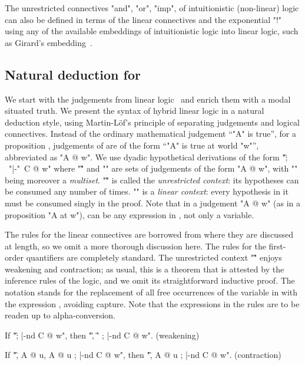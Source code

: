\documentclass{article}
\begin{document}
The unrestricted connectives "and", "or", "imp", \etc of intuitionistic
(non-linear) logic can also be defined in terms of the linear connectives and
the exponential "!"  using any of the available embeddings of intuitionistic
logic into linear logic, such as Girard's embedding~\cite{girard87tcs}.

\subsection{Natural deduction for \hyll}

We start with the judgements from linear logic~\cite{girard87tcs} and enrich
them with a modal situated truth. We present the syntax of hybrid linear logic
in a natural deduction style, using Martin-L\"{o}f's principle of separating
judgements and logical connectives.  
Instead of the ordinary mathematical judgement ``"A" is true'', for a proposition ,
judgements of \hyll are of the form ``"A" is true at world "w"'', abbreviated as "A @ w". 
We use dyadic hypothetical derivations of
the form "\G ; \D \ "|-"\ C @ w" where "\G" and "\D" are sets of judgements of
the form "A @ w", with "\D" being moreover a \emph{multiset}.  "\G" is called
the \emph{unrestricted context}: its hypotheses can be consumed any number of
times.  "\D" is a \emph{linear context}: every hypothesis in it must be consumed
singly in the proof.
Note that in a judgement "A @ w" (as in a proposition "A at w"),  can be 
any expression in , not only a variable.

The rules for the linear connectives are borrowed from \cite{chaudhuri03tr}
where they are discussed at length, so we omit a more thorough discussion here.
The rules for the first-order quantifiers are completely standard.  The
unrestricted context "\G" enjoys weakening and contraction; as usual, this is a
theorem that is attested by the inference rules of the logic, and we omit its
straightforward inductive proof. 
The notation  stands for the replacement of all free occurrences
of the variable  in  with the expression , avoiding capture. 
Note that the expressions in the rules are to be readen up to alpha-conversion.

\begin{thm} \label{thm:struct} \mbox{}
\begin{ecom}
  \item If "\G ; \D |-nd C @ w", then "\G, \G' ; \D |-nd C @ w". (weakening)
  \item If "\G, A @ u, A @ u ; \D |-nd C @ w", then "\G, A @ u ; \D |-nd C @ w". (contraction)
  \end{ecom}
\end{thm}
\end{document}
